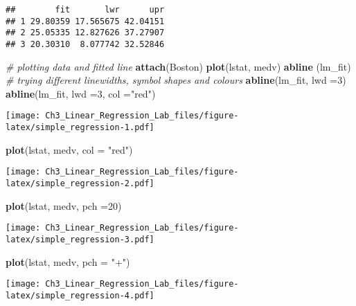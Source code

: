 \documentclass[]{article}
\newenvironment{Shaded}{\begin{snugshade}}{\end{snugshade}}
\newcommand{\CommentTok}[1]{\textcolor[rgb]{0.56,0.35,0.01}{\textit{#1}}}
\newcommand{\DataTypeTok}[1]{\textcolor[rgb]{0.13,0.29,0.53}{#1}}
\newcommand{\DecValTok}[1]{\textcolor[rgb]{0.00,0.00,0.81}{#1}}
\newcommand{\KeywordTok}[1]{\textcolor[rgb]{0.13,0.29,0.53}{\textbf{#1}}}
\newcommand{\NormalTok}[1]{#1}
\newcommand{\StringTok}[1]{\textcolor[rgb]{0.31,0.60,0.02}{#1}}
\begin{document}
\begin{verbatim}
##        fit       lwr      upr
## 1 29.80359 17.565675 42.04151
## 2 25.05335 12.827626 37.27907
## 3 20.30310  8.077742 32.52846
\end{verbatim}

\begin{Shaded}
\begin{Highlighting}[]
\CommentTok{# plotting data and fitted line}
\KeywordTok{attach}\NormalTok{(Boston)}
\KeywordTok{plot}\NormalTok{(lstat, medv)}
\KeywordTok{abline}\NormalTok{ (lm_fit)}
\CommentTok{# trying different linewidths, symbol shapes and colours}
\KeywordTok{abline}\NormalTok{(lm_fit, }\DataTypeTok{lwd =}\DecValTok{3}\NormalTok{)}
\KeywordTok{abline}\NormalTok{(lm_fit, }\DataTypeTok{lwd =}\DecValTok{3}\NormalTok{, }\DataTypeTok{col =}\StringTok{"red"}\NormalTok{)}
\end{Highlighting}
\end{Shaded}

\texttt{[image: Ch3\_Linear\_Regression\_Lab\_files/figure-latex/simple\_regression-1.pdf]}

\begin{Shaded}
\begin{Highlighting}[]
\KeywordTok{plot}\NormalTok{(lstat, medv, }\DataTypeTok{col =} \StringTok{"red"}\NormalTok{)}
\end{Highlighting}
\end{Shaded}

\texttt{[image: Ch3\_Linear\_Regression\_Lab\_files/figure-latex/simple\_regression-2.pdf]}

\begin{Shaded}
\begin{Highlighting}[]
\KeywordTok{plot}\NormalTok{(lstat, medv, }\DataTypeTok{pch =}\DecValTok{20}\NormalTok{)}
\end{Highlighting}
\end{Shaded}

\texttt{[image: Ch3\_Linear\_Regression\_Lab\_files/figure-latex/simple\_regression-3.pdf]}

\begin{Shaded}
\begin{Highlighting}[]
\KeywordTok{plot}\NormalTok{(lstat, medv, }\DataTypeTok{pch =} \StringTok{"+"}\NormalTok{)}
\end{Highlighting}
\end{Shaded}

\texttt{[image: Ch3\_Linear\_Regression\_Lab\_files/figure-latex/simple\_regression-4.pdf]}
\end{document}
